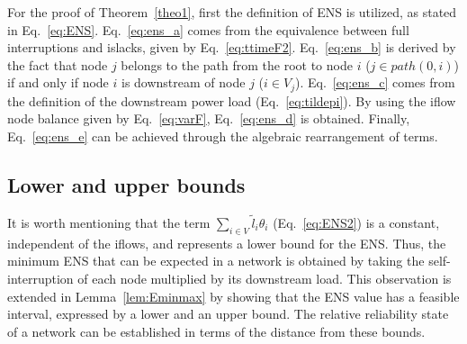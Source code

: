 For the proof of Theorem~\ref{theo1}, first the definition of ENS is utilized, as stated in Eq.~\eqref{eq:ENS}. Eq.~\eqref{eq:ens_a} comes from the equivalence between full interruptions and islacks, given by Eq.~\eqref{eq:ttimeF2}. Eq.~\eqref{eq:ens_b} is derived by the fact that node $j$ belongs to the path from the root to node $i$ ($j \in path(0,i)$) if and only if node $i$ is downstream of node $j$ ($i \in V_j$).  Eq.~\eqref{eq:ens_c} comes from the definition of the downstream power load (Eq.~\ref{eq:tildepi}). By using the iflow node balance given by Eq.~\eqref{eq:varF}, Eq.~\eqref{eq:ens_d} is obtained. Finally, Eq.~\eqref{eq:ens_e} can be achieved through the algebraic rearrangement of terms. 

\subsection{Lower and upper bounds} 

\label{ssec:lbub}

It is worth mentioning that the term $\displaystyle \sum_{i \in V}{\tilde{l}_i\theta_{i}}$ (Eq.~\ref{eq:ENS2}) is a constant, independent of the iflows, and represents a lower bound for the ENS.
Thus, the minimum ENS that can be expected in a network is obtained by taking the self-interruption of each node multiplied by its downstream load. This observation is extended in Lemma~\ref{lem:Eminmax} by showing that the ENS value has a feasible interval, expressed by a lower and an upper bound. The relative reliability state of a network can be established in terms of the distance from these bounds.


